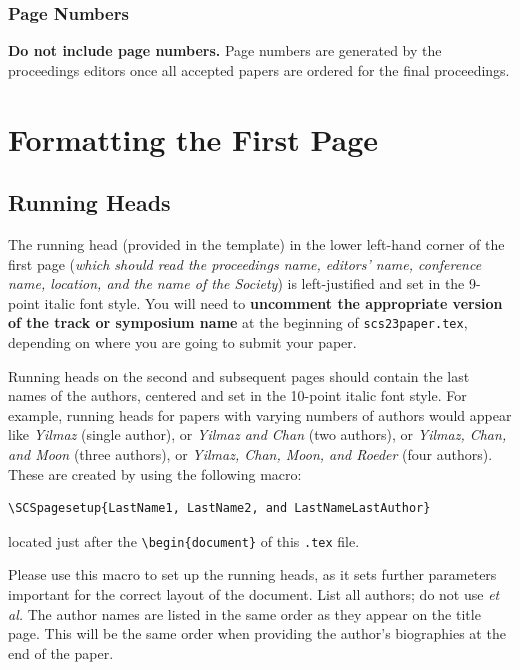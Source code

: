 \documentclass{article}
\begin{document}
\subsubsection{Page Numbers}
\textbf{Do not include page numbers.} Page numbers are generated by the proceedings editors once all accepted papers are ordered for the final proceedings.


\section{Formatting the First Page}

\subsection{Running Heads}
The running head (provided in the template) in the lower left-hand corner of the first page (\textit{which should read the proceedings name, editors' name, conference name, location, and the name of the Society}) is left-justified and set in the 9-point italic font style. %
You will need to \textbf{uncomment the appropriate version of the track or symposium name} at the beginning of \texttt{scs23paper.tex}, depending on where you are going to submit your paper.

Running heads on the second and subsequent pages should contain the last names of the authors, centered and set in the 10-point italic font style. For example, running heads for papers with varying numbers of authors would appear like \emph{Yilmaz} (single author), or \emph{Yilmaz and Chan} (two authors), or \emph{Yilmaz, Chan, and Moon} (three authors), or \emph{Yilmaz, Chan, Moon, and Roeder} (four authors). These are created by using the following macro:

\noindent \begin{verbatim}
\SCSpagesetup{LastName1, LastName2, and LastNameLastAuthor}
\end{verbatim}

located just after the \verb+\begin{document}+ of this \texttt{.tex} file.

Please use this macro to set up the running heads, as it sets further parameters important for the correct layout of the document. List all authors; do not use \textit{et al.} The author names are listed in the same order as they appear on the title page. This will be the same order when providing the author's biographies at the end of the paper.
\end{document}

